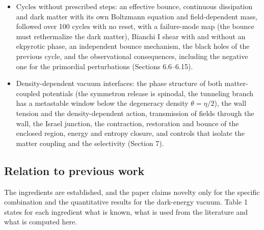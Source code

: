 \documentclass[11pt,a4paper]{article}
\begin{document}
\begin{itemize}
\item Cycles without prescribed steps: an effective bounce, continuous dissipation and dark matter with its own Boltzmann equation and field-dependent mass, followed over 100 cycles with no reset, with a failure-mode map (the bounce must rethermalize the dark matter), Bianchi I shear with and without an ekpyrotic phase, an independent bounce mechanism, the black holes of the previous cycle, and the observational consequences, including the negative one for the primordial perturbations (Sections 6.6--6.15).
\item Density-dependent vacuum interfaces: the phase structure of both matter-coupled potentials (the symmetron release is spinodal, the tunneling branch has a metastable window below the degeneracy density $\theta=\eta/2$), the wall tension and the density-dependent action, transmission of fields through the wall, the Israel junction, the contraction, restoration and bounce of the enclosed region, energy and entropy closure, and controls that isolate the matter coupling and the selectivity (Section 7).
\end{itemize}
\subsection{Relation to previous work}
The ingredients are established, and the paper claims novelty only for the specific combination and the quantitative results for the dark-energy vacuum. Table 1 states for each ingredient what is known, what is used from the literature and what is computed here.
\end{document}
